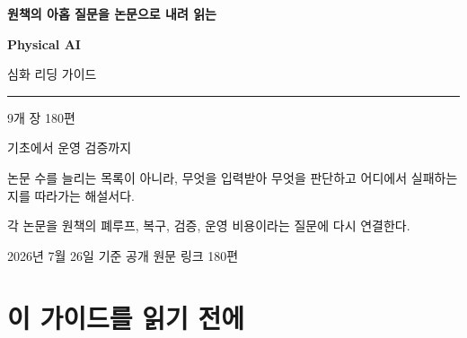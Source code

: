\documentclass[11pt,openany]{book}
\begin{document}
\frontmatter

\begin{titlepage}

\pagecolor{deepblue}\color{white}

\thispagestyle{empty}

\vspace*{14mm}

{\sffamily\bfseries\fontsize{15}{18}\selectfont 원책의 아홉 질문을 논문으로 내려 읽는\par}

\vspace{11mm}

{\sffamily\bfseries\fontsize{32}{40}\selectfont Physical AI\par 심화 리딩 가이드\par}

\vspace{8mm}

{\color{coral}\rule{45mm}{2.5pt}}\par

\vspace{8mm}

{\sffamily\fontsize{17}{25}\selectfont 9개 장 \quad 180편\par 기초에서 운영 검증까지\par}

\vfill

\begin{minipage}{0.82\textwidth}\color{white!84}\large

논문 수를 늘리는 목록이 아니라, 무엇을 입력받아 무엇을 판단하고 어디에서 실패하는지를 따라가는 해설서다.\par

각 논문을 원책의 폐루프, 복구, 검증, 운영 비용이라는 질문에 다시 연결한다.

\end{minipage}

\vspace{18mm}

{\sffamily\small 2026년 7월 26일 기준 \quad\textbullet\quad 공개 원문 링크 180편}

\end{titlepage}

\pagecolor{paper}\color{ink}

\cleardoublepage

\chapter*{이 가이드를 읽기 전에}
\end{document}

